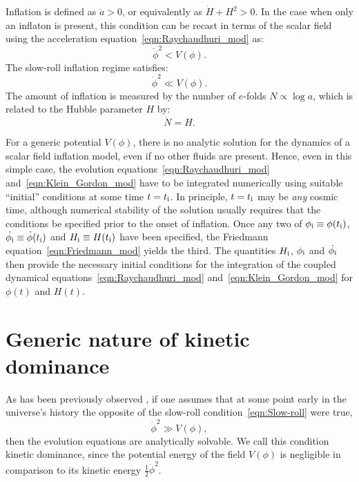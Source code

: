 Inflation is defined as \(\ddot{a}>0\), or equivalently as \(\dot{H}+H^2>0\). In the case when only an inflaton is present, this condition can be recast in terms of the scalar field using the acceleration equation~\eqref{eqn:Raychaudhuri_mod} as:
%
\begin{equation}
  \dot{\phi}^2<V(\phi).
  \label{eqn:Onset_inflation}
\end{equation}
%
The slow-roll inflation regime satisfies:
%
\begin{equation}
  \dot{\phi}^2\ll V(\phi).
  \label{eqn:Slow-roll}
\end{equation}
%
The amount of inflation is measured by the number of \(e\)-folds \(N\propto \log a\), which is related to the Hubble parameter \(H\) by:
%
\begin{equation}
  \dot{N}=H.\label{eqn:e-folds}
\end{equation}
%

For a generic potential \(V(\phi)\), there is no analytic solution for the dynamics of a scalar field inflation model, even if no other fluids are present. Hence, even in this simple case, the evolution equations~\eqref{eqn:Raychaudhuri_mod} and~\eqref{eqn:Klein_Gordon_mod} have to be integrated numerically using suitable ``initial'' conditions at some time \(t=t_{\mathrm{i}}\). In principle, \(t=t_{\mathrm{i}}\) may be {\em any\/} cosmic time, although numerical stability of the solution usually requires that the conditions be specified prior to the onset of inflation.  Once any two of \(\phi_{\mathrm{i}} \equiv \phi(t_{\mathrm{i}})\), \(\dot{\phi_{\mathrm{i}}} \equiv \dot{\phi}(t_{\mathrm{i}})\) and \(H_{\mathrm{i}} \equiv H(t_{\mathrm{i}})\) have been specified, the Friedmann equation~\eqref{eqn:Friedmann_mod} yields the third. The quantities \(H_{\mathrm{i}}\), \(\phi_{\mathrm{i}}\) and \(\dot{\phi_{\mathrm{i}}}\) then provide the necessary initial conditions for the integration of the coupled dynamical equations~\eqref{eqn:Raychaudhuri_mod} and~\eqref{eqn:Klein_Gordon_mod} for \(\phi(t)\) and \(H(t)\).
\section{Generic nature of kinetic dominance}
\label{sec:The_generic_nature_of_kinetic_dominance}

As has been previously observed \citep{Linde_initial_conditions_1985, belinsky_inflationary_1985,particle_astrophysics_1990}, if one assumes that at some point early in the universe's history the opposite of the slow-roll condition~\eqref{eqn:Slow-roll} were true,
%
\begin{equation}
  \dot\phi^2\gg V(\phi),
  \label{eqn:kddef}
\end{equation}
%
then the evolution equations are analytically solvable.  We call this condition kinetic dominance, since the potential energy of the field \(V(\phi)\) is negligible in comparison to its kinetic energy \(\frac{1}{2}\dot\phi^2\).

